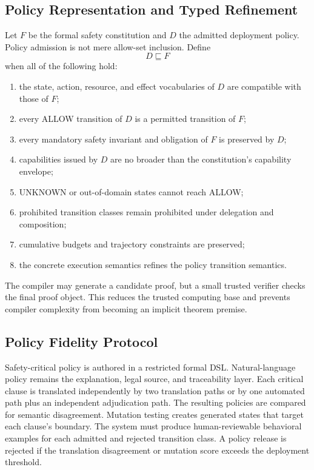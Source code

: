 \documentclass[11pt]{article}
\def\ensuremath#1{#1}%
\def\mathsf#1{#1}%
\newcommand{\ALLOW}{\ensuremath{\mathsf{ALLOW}}}
\newcommand{\UNKNOWN}{\ensuremath{\mathsf{UNKNOWN}}}
\newcommand{\PRef}{\ensuremath{\sqsubseteq}}
\begin{document}
\subsection{Policy Representation and Typed Refinement}
Let \(F\) be the formal safety constitution and \(D\) the admitted deployment policy. Policy admission is not mere allow-set inclusion. Define
\[
D\PRef F
\]
when all of the following hold:
\begin{enumerate}
\item the state, action, resource, and effect vocabularies of \(D\) are compatible with those of \(F\);
\item every \ALLOW{} transition of \(D\) is a permitted transition of \(F\);
\item every mandatory safety invariant and obligation of \(F\) is preserved by \(D\);
\item capabilities issued by \(D\) are no broader than the constitution's capability envelope;
\item \UNKNOWN{} or out-of-domain states cannot reach \ALLOW{};
\item prohibited transition classes remain prohibited under delegation and composition;
\item cumulative budgets and trajectory constraints are preserved;
\item the concrete execution semantics refines the policy transition semantics.
\end{enumerate}
The compiler may generate a candidate proof, but a small trusted verifier checks the final proof object. This reduces the trusted computing base and prevents compiler complexity from becoming an implicit theorem premise.

\subsection{Policy Fidelity Protocol}
Safety-critical policy is authored in a restricted formal DSL. Natural-language policy remains the explanation, legal source, and traceability layer. Each critical clause is translated independently by two translation paths or by one automated path plus an independent adjudication path. The resulting policies are compared for semantic disagreement. Mutation testing creates generated states that target each clause's boundary. The system must produce human-reviewable behavioral examples for each admitted and rejected transition class. A policy release is rejected if the translation disagreement or mutation score exceeds the deployment threshold.
\end{document}
